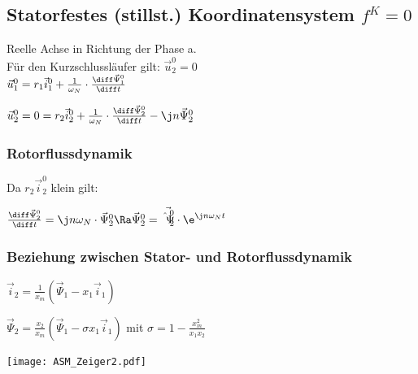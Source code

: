 \documentclass[german]{latex4ei_fs}
\begin{document}
\begin{sectionbox}
\subsection{Statorfestes (stillst.) Koordinatensystem $f^K = 0$}

Reelle Achse in Richtung der Phase a. \\

Für den Kurzschlussläufer gilt: $\vec u_2^0 = 0$ \\

$\vec u_1^0 = r_1 \vec i_1^0 + \frac{1}{\omega_N} \cdot \frac{\diff \vec \Psi_1^0}{\diff t}$

$\vec u_2^0 = 0 = r_2 \vec i_2^0 + \frac{1}{\omega_N} \cdot \frac{\diff \vec \Psi_2^0}{\diff t} - \j n \vec \Psi_2^0$ \\

\subsubsection*{Rotorflussdynamik}

Da $r_2 \vec i_2^0$ klein gilt:

$\frac{\diff \vec \Psi_2^0}{\diff t} = \j n \omega_N \cdot \vec \Psi_2^0 \Ra \vec \Psi_2^0 = \vec{\hat \Psi_2^0} \cdot \e^{\j n \omega_N t}$

\subsubsection*{Beziehung zwischen Stator- und Rotorflussdynamik}

$\vec i_2 = \frac{1}{x_m} (\vec \Psi_1 - x_1 \vec i_1)$

$\vec \Psi_2 = \frac{x_2}{x_m} (\vec \Psi_1 - \sigma x_1 \vec i_1)$ mit $\sigma = 1 - \frac{x_m^2}{x_1 x_2}$

\texttt{[image: ASM\_Zeiger2.pdf]}



\end{sectionbox}
\end{document}
